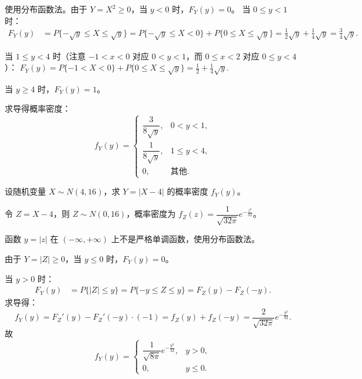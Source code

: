 \documentclass[lang=cn,11pt]{elegantbook}
\begin{document}
\begin{solution}
使用分布函数法。由于 $Y = X^2 \ge 0$，当 $y < 0$ 时，$F_Y(y) = 0$。
当 $0 \le y < 1$ 时：
\[
\begin{aligned}
F_Y(y) &= P\{-\sqrt{y} \le X \le \sqrt{y}\} = P\{-\sqrt{y} \le X < 0\} + P\{0 \le X \le \sqrt{y}\} = \frac{1}{2}\sqrt{y} + \frac{1}{4}\sqrt{y} = \frac{3}{4}\sqrt{y}.
\end{aligned}
\]

当 $1 \le y < 4$ 时（注意 $-1 < x < 0$ 对应 $0 < y < 1$，而 $0 \le x < 2$ 对应 $0 \le y < 4$）：
\(
F_Y(y) = P\{-1 < X < 0\} + P\{0 \le X \le \sqrt{y}\} = \frac{1}{2} + \frac{1}{4}\sqrt{y}.
\)

当 $y \ge 4$ 时，$F_Y(y) = 1$。

求导得概率密度：
\[
f_Y(y) = \begin{cases}
\dfrac{3}{8\sqrt{y}}, & 0 < y < 1, \\
\dfrac{1}{8\sqrt{y}}, & 1 \le y < 4, \\
0, & \text{其他}.
\end{cases}
\]
\end{solution}


\begin{exercise}\label{exer:2-31}
设随机变量 $X \sim N(4,16)$，求 $Y=|X-4|$ 的概率密度 $f_Y(y)$。
\end{exercise}

\begin{solution}
令 $Z = X-4$，则 $Z \sim N(0,16)$，概率密度为 $f_Z(z) = \dfrac{1}{\sqrt{32\pi}} e^{-\frac{z^2}{32}}$。

函数 $y = |z|$ 在 $(-\infty,+\infty)$ 上不是严格单调函数，使用分布函数法。

由于 $Y = |Z| \ge 0$，当 $y \le 0$ 时，$F_Y(y) = 0$。

当 $y > 0$ 时：
\begin{align*}
F_Y(y) &= P\{|Z| \le y\} = P\{-y \le Z \le y\} = F_Z(y) - F_Z(-y).
\end{align*}
求导得：
\[
f_Y(y) = F_Z'(y) - F_Z'(-y) \cdot (-1) = f_Z(y) + f_Z(-y) = \frac{2}{\sqrt{32\pi}} e^{-\frac{y^2}{32}}.
\]
故
\[
f_Y(y) = \begin{cases}
\dfrac{1}{\sqrt{8\pi}} e^{-\frac{y^2}{32}}, & y > 0, \\
0, & y \le 0.
\end{cases}
\]
\end{solution}
\end{document}
